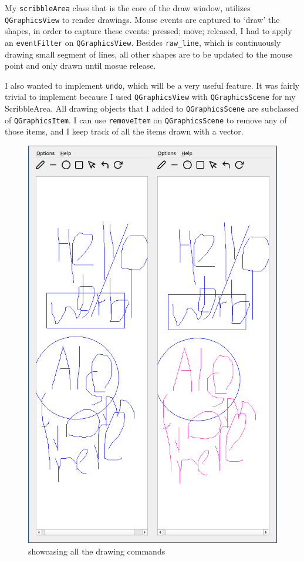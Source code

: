 \documentclass[11pt]{article}
\begin{document}
\begin{multicols*}{2}
My \verb|scribbleArea| class that is the core of the draw window, utilizes \verb|QGraphicsView| to render drawings. Mouse events are captured to `draw' the shapes, in order to capture these events: pressed; move; released, I had to apply an \verb|eventFilter| on \verb|QGraphicsView|. Besides \verb|raw_line|, which is continuously drawing small segment of lines, all other shapes are to be updated to the mouse point and only drawn until mosue release.

I also wanted to implement \verb|undo|, which will be a very useful feature. It was fairly trivial to implement because I used \verb|QGraphicsView| with \verb|QGraphicsScene| for my ScribbleArea. All drawing objects that I added to \verb|QGraphicsScene| are subclassed of \verb|QGraphicsItem|. I can use \verb|removeItem| on \verb|QGraphicsScene| to remove any of those items, and I keep track of all the items drawn with a vector. 

\begin{figure}[H]
  \centering
  \includegraphics[width=\columnwidth]{show_all_draw}
  \caption{showcasing all the drawing commands}
  \label{fig:showcase_drawCmd}
\end{figure}
\figsquish


\end{multicols*}
\end{document}
